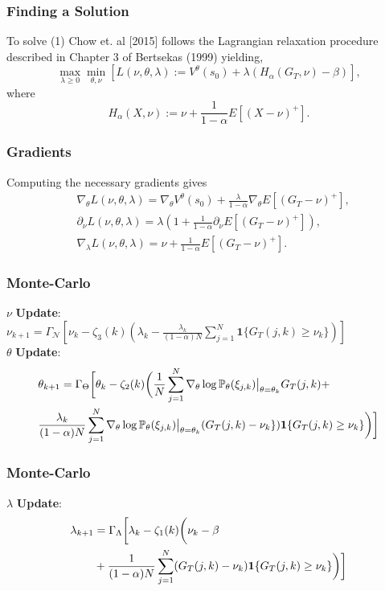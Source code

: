 \documentclass{beamer}
\begin{document}
\begin{frame}
	\frametitle{Finding a Solution}
	To solve (1) Chow et. al [2015] follows the Lagrangian relaxation procedure described in Chapter 3 of Bertsekas (1999) yielding,
	\begin{displaymath}
	\max_{\lambda \geq 0}\min_{\theta, \nu}\left[L(\nu,\theta,\lambda):=V^{\theta}(s_0)+\lambda\left(H_{\alpha}\left(G_T,\nu\right)-\beta\right)\right],
	\end{displaymath}
	where
	\begin{displaymath}
	H_{\alpha}(X,\nu) := \nu + \frac{1}{1-\alpha}E\left[(X-\nu)^+\right].
	\end{displaymath}
\end{frame}
\begin{frame}
	\frametitle{Gradients}
	Computing the necessary gradients gives
	\begin{align*}
	&\nabla_{\theta}L(\nu,\theta,\lambda)=\nabla_{\theta}V^{\theta}(s_0)+\frac{\lambda}{1-\alpha}\nabla_{\theta}E\left[\left(G_T-\nu\right)^+\right],\\
	&\partial_{\nu}L(\nu,\theta,\lambda)=\lambda\left(1+\frac{1}{1-\alpha}\partial_{\nu}E\left[\left(G_T-\nu\right)^+\right]\right),\\
	&\nabla_{\lambda}L(\nu,\theta,\lambda)= \nu+\frac{1}{1-\alpha}E\left[\left(G_T-\nu\right)^+\right].
	\end{align*}
\end{frame}
\begin{frame}
	\frametitle{Monte-Carlo}
		 $\nu$ \textbf{Update}:\\
		  $ \nu_{k+1}=\Gamma_{\mathcal{N}}\left[ \nu_k-\zeta_3(k)\left(\lambda_k-\frac{\lambda_k}{(1-\alpha)N} \sum\limits_{j=1}^N\mathbf{1}\{G_T(j,k) \geq \nu_k\}\right)\right] $\\
		 $\theta$ \textbf{Update}:
				\begin{align}
				&\theta_{k+1}  =\Gamma_{\Theta}\bigg[ \theta_k-\zeta_2(k)\bigg(\frac{1}{N}\sum\limits_{j=1}^N \nabla_{\theta}\log \mathbb{P}_{\theta}(\xi_{j,k})\big| _{\theta=\theta_k}G_T(j,k)+ \notag\\
				&\frac{\lambda_k}{(1-\alpha)N} \sum\limits_{j=1}^N \nabla_{\theta}\log \mathbb{P}_{\theta}(\xi_{j,k})\big| _{\theta=\theta_k} (G_T(j,k) - \nu_k \})\mathbf{1}\{G_T(j,k) \geq \nu_k\}\bigg)\bigg] \notag
				\end{align} 
\end{frame}
\begin{frame}
	\frametitle{Monte-Carlo}
	$\lambda$ \textbf{Update}:
	\begin{align}
	\lambda_{k+1}&=\Gamma_{\Lambda}\bigg[ \lambda_k-\zeta_1(k)\bigg(\nu_k - \beta\\
	& + \frac{1}{(1-\alpha)N}\sum\limits_{j=1}^N(G_T(j,k) - \nu_k )\mathbf{1}\{G_T(j,k) \geq \nu_k\}\bigg)\bigg] \notag
	\end{align}
\end{frame}
\end{document}
